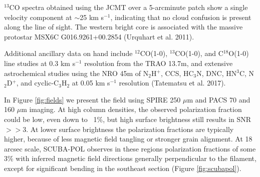 \documentclass[11pt]{amsart}
\begin{document}
{$^{13}$CO spectra 
obtained using the JCMT over a 5-arcminute patch
show a single velocity component at  $\sim$25 km s$^{-1}$, indicating that no cloud confusion is present along the line of sight. The western bright core is associated with the massive protostar MSX6C G016.9261+00.2854 (Urquhart et al. 2011).

Additional ancillary data on hand include $^{12}$CO(1-0), $^{13}$CO(1-0), and C$^{18}$O(1-0) line studies at 0.3 km s$^{-1}$ resolution from the TRAO 13.7m, 
and extensive astrochemical studies using the NRO 45m of N$_2$H$^+$, CCS, HC$_3$N, DNC, HN$^3$C, N$_2$D$^+$, and cyclic-C$_3$H$_2$ at 
0.05 km s$^{-1}$ resolution (Tatematsu et al. 2017).

In Figure \ref{fig:fields} we present the field using SPIRE 250 $\mu$m and PACS 70 and 160 $\mu$m imaging. At high column densities, the observed polarization fraction could be low, even down to ~1\%, but high surface brightness still results in SNR$>>$3. At lower surface brightness the polarization fractions are typically higher, because of less magnetic field tangling or stronger grain alignment. At 18 arcsec scale, SCUBA-POL observes in these regions polarization fractions of some 3\%
with inferred magnetic field directions generally perpendicular to the filament, except for significant bending in the southeast section (Figure \ref{fig:scubapol}).


\clearpage

}
\end{document}
